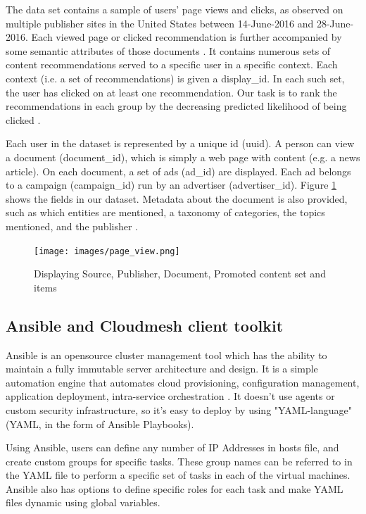 \documentclass[9pt,twocolumn,twoside]{../../styles/osajnl}
\begin{document}
The data set contains a sample of users’ page views and clicks, as observed on multiple publisher sites in the United States between 14-June-2016 and 28-June-2016. Each viewed page or clicked recommendation is further accompanied by some semantic attributes of those documents \cite{kaggle-outbrain}. It contains numerous sets of content recommendations served to a specific user in a specific context. Each context (i.e. a set of recommendations) is given a display\_id. In each such set, the user has clicked on at least one recommendation. Our task is to rank the recommendations in each group by the decreasing predicted likelihood of being clicked \cite{kaggle-outbrain}.

Each user in the dataset is represented by a unique id (uuid). A person can view a document (document\_id), which is simply a web page with content (e.g.  a news article). On each document, a set of ads (ad\_id) are displayed. Each ad belongs to a campaign (campaign\_id) run by an advertiser (advertiser\_id). Figure \ref{fig:OutbrainData} shows the fields in our dataset. Metadata about the document is also provided, such as which entities are mentioned, a taxonomy of categories, the topics mentioned, and the publisher \cite{kaggle-outbrain}.

\begin{figure}[hptb]
\centering
\texttt{[image: images/page\_view.png]}
\caption{Displaying Source, Publisher, Document, Promoted content set and items \cite{kaggle-outbrain}}
\label{fig:OutbrainData}
\end{figure}

\subsection{Ansible and Cloudmesh client toolkit}
Ansible is an opensource cluster management tool which has the ability to maintain a fully immutable server architecture and design. It is a simple automation engine that automates cloud provisioning, configuration management, application deployment, intra-service orchestration \cite{www-ansible-work}. It doesn't use agents or custom security infrastructure, so it's easy to deploy by using "YAML-language" (YAML, in the form of Ansible Playbooks). 

Using Ansible, users can define any number of IP Addresses in hosts file, and create custom groups for specific tasks. These group names can be referred to in the YAML file to perform a specific set of tasks in each of the virtual machines. Ansible also has options to define specific roles for each task and make YAML files dynamic using global variables.
\end{document}
